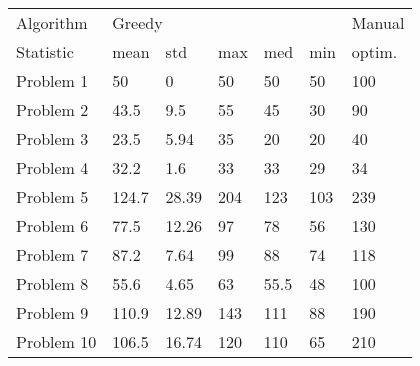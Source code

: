 \begin{tabular}{lllllll}
\toprule
Algorithm & \multicolumn{5}{l}{Greedy} & Manual \\
Statistic &   mean &    std &  max &   med &  min & optim. \\
\midrule
Problem 1  &     50 &      0 &   50 &    50 &   50 &    100 \\
Problem 2  &   43.5 &    9.5 &   55 &    45 &   30 &     90 \\
Problem 3  &   23.5 &   5.94 &   35 &    20 &   20 &     40 \\
Problem 4  &   32.2 &    1.6 &   33 &    33 &   29 &     34 \\
Problem 5  &  124.7 &  28.39 &  204 &   123 &  103 &    239 \\
Problem 6  &   77.5 &  12.26 &   97 &    78 &   56 &    130 \\
Problem 7  &   87.2 &   7.64 &   99 &    88 &   74 &    118 \\
Problem 8  &   55.6 &   4.65 &   63 &  55.5 &   48 &    100 \\
Problem 9  &  110.9 &  12.89 &  143 &   111 &   88 &    190 \\
Problem 10 &  106.5 &  16.74 &  120 &   110 &   65 &    210 \\
\bottomrule
\end{tabular}
